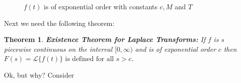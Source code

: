 \documentclass{article}
\newtheorem{thm}{Theorem}[section]
\theoremstyle{definition}
\begin{document}
\begin{figure}[H]
\caption{$f(t)$ is of exponential order with constants $c, M$ and $T$}
\label{fig:exponential_order}
\end{figure}

\bigskip
\noindent
Next we need the following theorem:

\newpage
\bigskip
\begin{thm} 
{\bf Existence Theorem for Laplace Transforms:} \normalfont If $f$ is s piecewise continuous on the interval $[0,\infty)$ and is of exponential order $c$ then 
$F (s) = \mathcal{L}\{f (t)\} \text{ is defined for all $s > c$}.$
\end{thm}

\bigskip
\noindent
Ok, but why? Consider
\end{document}
